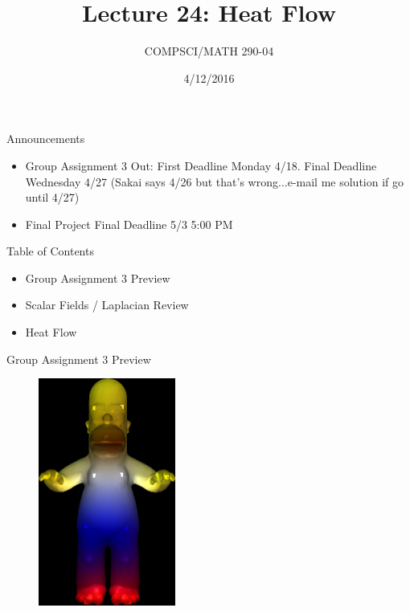 \documentclass{beamer}
\title{Lecture 24: Heat Flow}
\date{4/12/2016}
\institute{Chris Tralie, Duke University}
\author{COMPSCI/MATH 290-04}
\begin{document}
\frame{\titlepage}

\begin{frame}{Announcements}
\begin{itemize}[label=$\vartriangleright$]

\item Group Assignment 3 Out: First Deadline Monday 4/18.  Final Deadline Wednesday 4/27 (Sakai says 4/26 but that's wrong...e-mail me solution if go until 4/27)

\item Final Project Final Deadline 5/3 5:00 PM

\end{itemize}

\end{frame}

\begin{frame}{Table of Contents}

\begin{itemize}[label=$\blacktriangleright$]
	\item Group Assignment 3 Preview
\end{itemize}

\begin{itemize}[label=$\vartriangleright$]
	\item Scalar Fields / Laplacian Review
\end{itemize}

\begin{itemize}[label=$\vartriangleright$]
	\item Heat Flow
\end{itemize}

\end{frame}


\begin{frame}{Group Assignment 3 Preview}
\begin{figure}[t]
    \includegraphics[width=0.4\textwidth]{ColorSolution.png}
\end{figure}

\end{frame}
\end{document}
